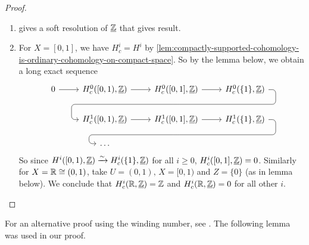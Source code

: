 \documentclass[../main.tex]{subfiles}
\begin{document}
\begin{proof}
    \begin{enumerate}
        \item {} gives a soft resolution of $\underline{\mathbb{Z}}$ that gives result.
        \item  For $X = [0,1]$, we have $H^i_c = H^i$ by \cref{lem:compactly-supported-cohomology-is-ordinary-cohomology-on-compact-space}. So by the lemma below, we obtain a long exact sequence
        \[\begin{tikzcd}
            0 \ar[r] & H^0_c([0,1), \underline{\bb Z}) \ar[r] & H^0_c([0,1], \underline{\bb Z}) \ar[r] \ar[draw=none]{d}[name=X, anchor=center]{} & H^0_c(\{1\}, \underline{\bb Z})
            \ar[rounded corners,
            to path={ -- ([xshift=2ex]\tikztostart.east)
                      |- (X.center) \tikztonodes
                      -| ([xshift=-2ex]\tikztotarget.west)
                      -- (\tikztotarget)}]{dll}[at end]{} \\
            & H^1_c([0,1), \underline{\bb Z}) \ar[r] & H^1_c([0,1], \underline{\bb Z}) \ar[r] \ar[draw=none]{d}[name=Y, anchor=center]{} & H^1_c(\{1\}, \underline{\bb Z})
            \ar[rounded corners,
            to path={ -- ([xshift=2ex]\tikztostart.east)
                      |- (Y.center) \tikztonodes
                      -| ([xshift=-2ex]\tikztotarget.west)
                      -- (\tikztotarget)}]{dll}[at end]{} \\
            & \dots & {} & {}
        \end{tikzcd}\]
        So since $H^i([0,1), \underline{\mathbb{Z}}) \xrightarrow{\sim} H^i_c(\{1\}, \underline{\mathbb{Z}})$ for all $i\geq 0$, $H^i_c([0,1], \underline{\mathbb{Z}}) = 0$. Similarly for $X = \mathbb{R} \cong (0,1)$, take $U = (0,1),\, X = [0,1)$ and $Z = \{0\}$ (as in lemma below). We conclude that $H^i_c(\mathbb{R}, \underline{\mathbb{Z}}) = \mathbb{Z}$ and $H^i_c(\mathbb{R}, \underline{\mathbb{Z}}) = 0$ for all other $i$. 
        \qedhere
    \end{enumerate}
\end{proof}

For an alternative proof using the winding number, see \cite[Section~\RN{3}.4]{IversenCohomologyOfSheaves}. The following lemma was used in our proof.
\end{document}
